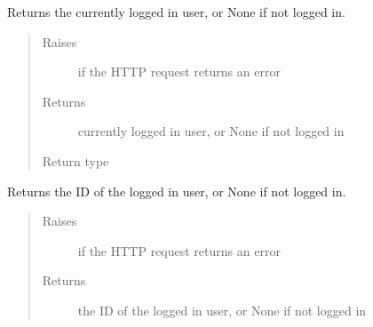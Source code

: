 \documentclass[letterpaper,10pt,english]{sphinxmanual}
\begin{document}
\begin{fulllineitems}

\begin{fulllineitems}
\label{\detokenize{autoapi/pine/client/index:pine.client.PineClient.get_logged_in_user}}
Returns the currently logged in user, or None if not logged in.
\begin{quote}\begin{description}
\item[{Raises}] \leavevmode
{\hyperref[\detokenize{autoapi/pine/client/exceptions/index:pine.client.exceptions.PineClientHttpException}]{}} \textendash{} if the HTTP request returns an error

\item[{Returns}] \leavevmode
currently logged in user, or None if not logged in

\item[{Return type}] \leavevmode
{}

\end{description}\end{quote}

\end{fulllineitems}


\begin{fulllineitems}
\label{\detokenize{autoapi/pine/client/index:pine.client.PineClient.get_my_user_id}}
Returns the ID of the logged in user, or None if not logged in.
\begin{quote}\begin{description}
\item[{Raises}] \leavevmode
{\hyperref[\detokenize{autoapi/pine/client/exceptions/index:pine.client.exceptions.PineClientHttpException}]{}} \textendash{} if the HTTP request returns an error

\item[{Returns}] \leavevmode
the ID of the logged in user, or None if not logged in


\end{description}
\end{quote}
\end{fulllineitems}
\end{fulllineitems}
\end{document}
